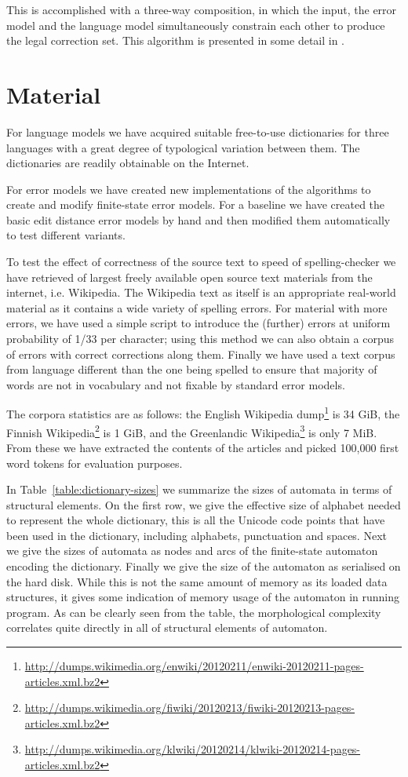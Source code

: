 \documentclass[11pt]{article}
\begin{document}
This is accomplished with a three-way composition, in which the input, the
error model and the language model simultaneously constrain each other to
produce the legal correction set. This algorithm is presented in some detail
in .

\section{Material}
\label{sec:materials}

For language models we have acquired suitable free-to-use
dictionaries for three languages with a great degree of
typological variation between them. The dictionaries
are readily obtainable on the Internet.

For error models we have created new implementations of the algorithms
to create and modify finite-state error models. For a baseline we have created
the basic edit distance error models by hand and then modified them
automatically to test different variants.

To test the effect of correctness of the source text to speed of
spelling-checker we have retrieved of largest freely available open source text
materials from the internet, i.e. Wikipedia. The Wikipedia text as itself is
an appropriate real-world material as it contains a wide variety of spelling
errors. For material with more errors, we have used a simple script to
introduce the (further) errors at uniform probability of 1/33 per character;
using this method we can also obtain a corpus of errors with correct
corrections along them. Finally we have used a text corpus from language
different than the one being spelled to ensure that majority of words are not
in vocabulary and not fixable by standard error models.

The corpora statistics are as follows: the English Wikipedia
dump\footnote{\url{http://dumps.wikimedia.org/enwiki/20120211/enwiki-20120211-pages-articles.xml.bz2}}
is 34 GiB, the Finnish
Wikipedia\footnote{\url{http://dumps.wikimedia.org/fiwiki/20120213/fiwiki-20120213-pages-articles.xml.bz2}}
is 1 GiB, and the Greenlandic
Wikipedia\footnote{\url{http://dumps.wikimedia.org/klwiki/20120214/klwiki-20120214-pages-articles.xml.bz2}}
is only 7 MiB. From these we have extracted the contents of the articles and
picked 100,000 first word tokens for evaluation purposes.

In Table~\ref{table:dictionary-sizes} we summarize the sizes of automata in
terms of structural elements. On the first row, we give the effective size of
alphabet needed to represent the whole dictionary, this is all the Unicode
code points that have been used in the dictionary, including alphabets, 
punctuation and spaces. Next we give the sizes of automata as nodes and
arcs of the finite-state automaton encoding the dictionary. Finally we give the
size of the automaton as serialised on the hard disk. While this is not the
same amount of memory as its loaded data structures, it gives some indication
of memory usage of the automaton in running program. As can be clearly
seen from the table, the morphological complexity correlates quite directly
in all of structural elements of automaton.
\end{document}
